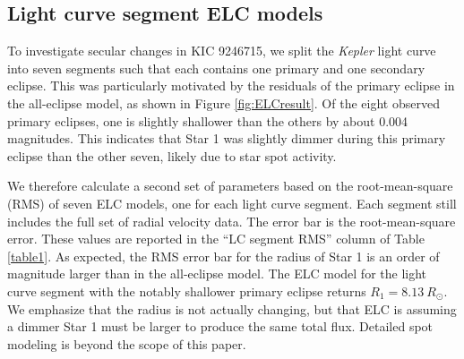 \subsection{Light curve segment ELC models}
To investigate secular changes in KIC 9246715, we split the \emph{Kepler} light curve into seven segments such that each contains one primary and one secondary eclipse. This was particularly motivated by the residuals of the primary eclipse in the all-eclipse model, as shown in Figure \ref{fig:ELCresult}. Of the eight observed primary eclipses, one is slightly shallower than the others by about 0.004 magnitudes. This indicates that Star 1 was slightly dimmer during this primary eclipse than the other seven, likely due to star spot activity.

We therefore calculate a second set of parameters based on the root-mean-square (RMS) of seven ELC models, one for each light curve segment. Each segment still includes the full set of radial velocity data. The error bar is the root-mean-square error. These values are reported in the ``LC segment RMS'' column of Table \ref{table1}. As expected, the RMS error bar for the radius of Star 1 is an order of magnitude larger than in the all-eclipse model. The ELC model for the light curve segment with the notably shallower primary eclipse returns $R_1 = 8.13 \ R_{\odot}$. We emphasize that the radius is not actually changing, but that ELC is assuming a dimmer Star 1 must be larger to produce the same total flux. Detailed spot modeling is beyond the scope of this paper.